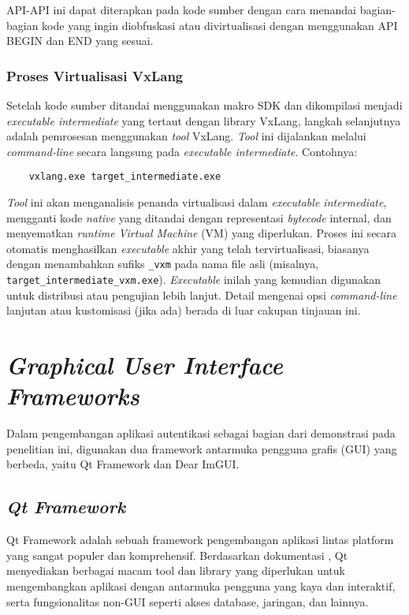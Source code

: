 \begin{itemize}
\begin{minted}
            VL_VIRTUALIZATION_BEGIN;

            printf("Virtualization Test!")

            VL_VIRTUALIZATION_END;

          }
    \end{verbatim}

\end{itemize}

API-API ini dapat diterapkan pada kode sumber dengan cara menandai bagian-bagian kode yang ingin diobfuskasi atau divirtualisasi dengan menggunakan API BEGIN dan END yang sesuai.

\subsubsection{Proses Virtualisasi VxLang}
Setelah kode sumber ditandai menggunakan makro SDK dan dikompilasi menjadi \textit{executable intermediate} yang tertaut dengan library VxLang, langkah selanjutnya adalah pemrosesan menggunakan \textit{tool} VxLang. \textit{Tool} ini dijalankan melalui \textit{command-line} secara langsung pada \textit{executable intermediate}. Contohnya:
\begin{verbatim}
    vxlang.exe target_intermediate.exe
\end{verbatim}
\textit{Tool} ini akan menganalisis penanda virtualisasi dalam \textit{executable intermediate}, mengganti kode \textit{native} yang ditandai dengan representasi \textit{bytecode} internal, dan menyematkan \textit{runtime Virtual Machine} (VM) yang diperlukan. Proses ini secara otomatis menghasilkan \textit{executable} akhir yang telah tervirtualisasi, biasanya dengan menambahkan sufiks \texttt{\_vxm} pada nama file asli (misalnya, \texttt{target\_intermediate\_vxm.exe}). \textit{Executable} inilah yang kemudian digunakan untuk distribusi atau pengujian lebih lanjut. Detail mengenai opsi \textit{command-line} lanjutan atau kustomisasi (jika ada) berada di luar cakupan tinjauan ini.

\section{\textit{Graphical User Interface Frameworks}}
Dalam pengembangan aplikasi autentikasi sebagai bagian dari demonstrasi pada penelitian ini, digunakan dua framework antarmuka pengguna grafis (GUI) yang berbeda, yaitu Qt Framework dan Dear ImGUI.

\subsection{\textit{Qt Framework}}
Qt Framework adalah sebuah framework pengembangan aplikasi lintas platform yang sangat populer dan komprehensif. Berdasarkan dokumentasi \cite{Qt}, Qt menyediakan berbagai macam tool dan library yang diperlukan untuk mengembangkan aplikasi dengan antarmuka pengguna yang kaya dan interaktif, serta fungsionalitas non-GUI seperti akses database, jaringan, dan lainnya.

